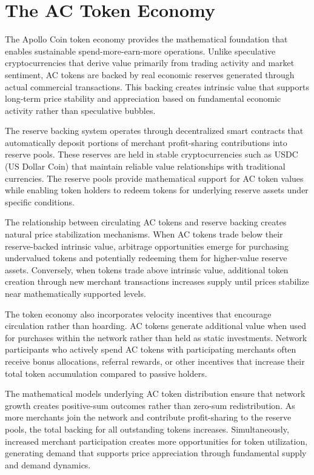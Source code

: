 \documentclass[
  Letterpaper,
]{scrbook}
\begin{document}
\section{The AC Token Economy}\label{the-ac-token-economy}

The Apollo Coin token economy provides the mathematical foundation that
enables sustainable spend-more-earn-more operations. Unlike speculative
cryptocurrencies that derive value primarily from trading activity and
market sentiment, AC tokens are backed by real economic reserves
generated through actual commercial transactions. This backing creates
intrinsic value that supports long-term price stability and appreciation
based on fundamental economic activity rather than speculative bubbles.

The reserve backing system operates through decentralized smart
contracts that automatically deposit portions of merchant profit-sharing
contributions into reserve pools. These reserves are held in stable
cryptocurrencies such as USDC (US Dollar Coin) that maintain reliable
value relationships with traditional currencies. The reserve pools
provide mathematical support for AC token values while enabling token
holders to redeem tokens for underlying reserve assets under specific
conditions.

The relationship between circulating AC tokens and reserve backing
creates natural price stabilization mechanisms. When AC tokens trade
below their reserve-backed intrinsic value, arbitrage opportunities
emerge for purchasing undervalued tokens and potentially redeeming them
for higher-value reserve assets. Conversely, when tokens trade above
intrinsic value, additional token creation through new merchant
transactions increases supply until prices stabilize near mathematically
supported levels.

The token economy also incorporates velocity incentives that encourage
circulation rather than hoarding. AC tokens generate additional value
when used for purchases within the network rather than held as static
investments. Network participants who actively spend AC tokens with
participating merchants often receive bonus allocations, referral
rewards, or other incentives that increase their total token
accumulation compared to passive holders.

The mathematical models underlying AC token distribution ensure that
network growth creates positive-sum outcomes rather than zero-sum
redistribution. As more merchants join the network and contribute
profit-sharing to the reserve pools, the total backing for all
outstanding tokens increases. Simultaneously, increased merchant
participation creates more opportunities for token utilization,
generating demand that supports price appreciation through fundamental
supply and demand dynamics.
\end{document}
